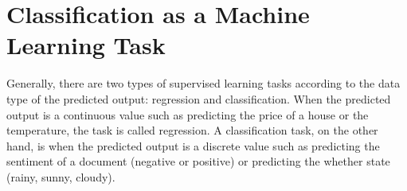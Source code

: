 %
%

\section{Classification as a Machine Learning Task}
Generally, there are two types of supervised learning tasks according to the data type of the predicted output: regression and classification. When the predicted output is a continuous value such as predicting the price of a house or the temperature, the task is called regression. A classification task, on the other hand, is when the predicted output is a discrete value such as predicting the sentiment of a document (negative or positive) or predicting the whether state (rainy, sunny, cloudy). 

